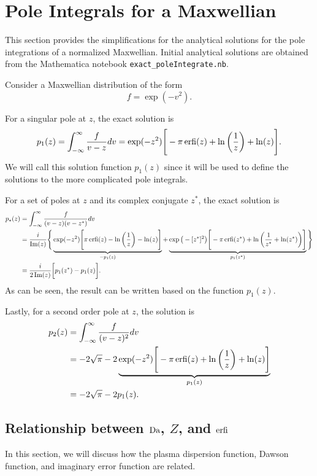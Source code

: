 \section{Pole Integrals for a Maxwellian}
\label{a:poleIntegrals_Maxwellian}
This section provides the simplifications for the analytical solutions for the pole integrations of a normalized Maxwellian.
Initial analytical solutions are obtained from the Mathematica notebook \verb*|exact_poleIntegrate.nb|.

Consider a Maxwellian distribution of the form
\begin{equation}
	f = \exp(-v^2).
	\label{eq:a_maxwellian}
\end{equation}

For a singular pole at $z$, the exact solution is
\begin{equation}
	p_1(z) = \int_{-\infty}^\infty \frac{f}{v-z} dv = 
	\exp(-z^2) \Bigg[ -\pi \operatorname{erfi}(z) + \ln\bigg(\frac{1}{z}\bigg) + \ln(z)   \Bigg].
\end{equation}
We will call this solution function $p_1(z)$ since it will be used to define the solutions to the more complicated pole integrals.

For a set of poles at $z$ and its complex conjugate $z^*$, the exact solution is
\begin{align}
	p_*(z) &=  \int_{-\infty}^\infty \frac{f}{(v-z)(v-z^*)} dv  \nonumber \\
	&= \frac{i}{\operatorname{Im}(z)} \Bigg\{ \underbrace{\exp(-z^2) \Bigg[ \pi \operatorname{erfi}(z) - \ln\bigg(\frac{1}{z}\bigg) - \ln(z)  \Bigg]}_{-p_1(z)}
	+ \underbrace{\exp\big(-[z^*]^2\big) \Bigg[ -\pi \operatorname{erfi}(z^*) + \ln \bigg(\frac{1}{z^*} + \ln(z^*) \bigg) \Bigg]}_{p_1(z^*)}
	\Bigg\}	\nonumber \\
	&= \frac{i}{2\operatorname{Im}(z)} \bigg[ p_1(z^*) - p_1(z) \bigg].
\end{align}
As can be seen, the result can be written based on the function $p_1(z)$.

Lastly, for a second order pole at $z$, the solution is
\begin{align}
	p_2(z) &= \int_{-\infty}^\infty \frac{f}{(v-z)^2} dv  \nonumber \\
	&= -2 \sqrt{\pi} - 2\underbrace{ \exp(-z^2) \Bigg[ -\pi \operatorname{erfi}(z) + \ln\bigg(\frac{1}{z}\bigg) + \ln(z)  \Bigg]}_{p_1(z)} \nonumber \\
	&= -2 \sqrt{\pi} - 2 p_1(z).
\end{align}

\subsection{Relationship between $\operatorname{Da}$, $Z$, and $\operatorname{erfi}$}
In this section, we will discuss how the plasma dispersion function, Dawson function, and imaginary error function are related.

